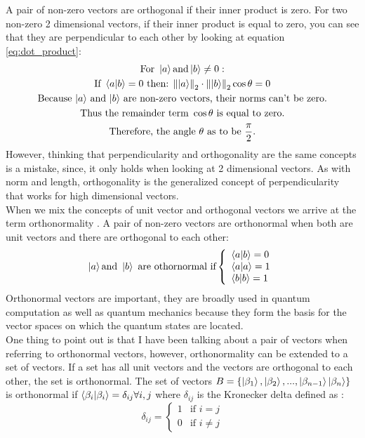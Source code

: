 A pair of non-zero vectors are orthogonal if their inner product is zero. For two non-zero 2 dimensional vectors, if their inner product is equal to zero, you can see that they are perpendicular to each other by looking at equation \eqref{eq:dot_product}:
\begin{multline*}
	 \text{For }\ket{a} \text{and} \ket{b}\neq 0 : \\
	\text{If }\bra{a}\ket{b} = 0 \text{ then: } \norm{\ket{a}}_2 \cdot \norm{\ket{b}}_2 \cos \theta = 0 \\
	 \text{Because $\ket{a}$ and $\ket{b}$ are non-zero vectors, their norms can't be zero.} \\
	 \text{Thus the remainder term } \cos\theta \text{ is equal to zero.} \\
	 \text{Therefore, the angle $\theta$ as to be } \frac{\pi}{2}. \\
\end{multline*}
However, thinking that perpendicularity and orthogonality are the same concepts is a mistake, since, it only holds when looking at 2 dimensional vectors. As with norm and length, orthogonality is the generalized concept of perpendicularity that works for high dimensional vectors. \\
When we mix the concepts of unit vector and orthogonal vectors we arrive at the term orthonormality \tocite. A pair of non-zero vectors are orthonormal when both are unit vectors and there are orthogonal to each other: 
$$
\ket{a} \text{and } \ket{b} \text{ are othornormal if} \left\{
	\begin{array}{ll}
		\bra{a}\ket{b} = 0 \\
		\bra{a}\ket{a} = 1 \\
		\bra{b}\ket{b} = 1 \\
	\end{array}
\right.
$$
Orthonormal vectors are important, they are broadly used in quantum computation as well as quantum mechanics because they form the basis for the vector spaces on which the quantum states are located.  \\
One thing to point out is that I have been talking about a pair of vectors when referring to orthonormal vectors, however, orthonormality can be extended to a set of vectors. If a set has all unit vectors and the vectors are orthogonal to each other, the set is orthonormal. The set of vectors $ B = \{\ket{\beta_1}, \ket{\beta_2}, ..., \ket{\beta_{n-1}} \ket{\beta_n}\} $ is
orthonormal if $\bra{\beta_i}\ket{\beta_i} = \delta_{ij}  \forall i, j$ \tocite\space where $\delta_{ij}$ is the Kronecker delta defined as 
: 
$$
\delta_{ij} =
\begin{cases}
	1 & \text{if } i=j\\
	0 & \text{if } i\neq j
\end{cases}
$$

